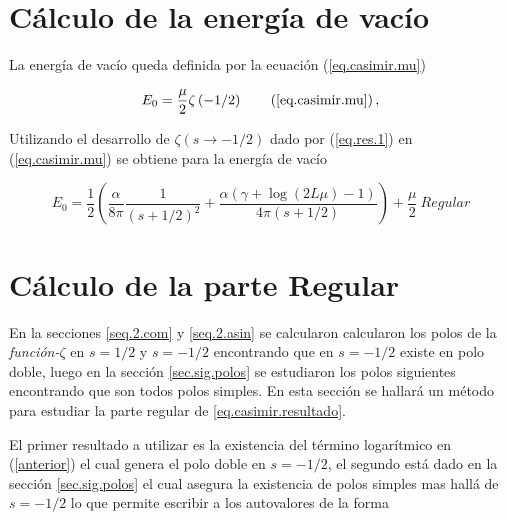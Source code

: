 \begin{comment}
\begin{equation}
\frac{1 }{2 \pi i}
\int _{circulo} \lambda ^{-2s } \partial \lambda \ Ln \left[
					\frac{e ^{\frac{i \alpha  \log ( 2 \lambda L )}{2 \lambda}} e ^{2 i \lambda L} S1}
					{\Gamma \left( 1 - \frac{i \alpha}{2 \lambda} \right)} - 
					\frac{e ^{\frac{-i \alpha  \log (2 \lambda L )}{2 \lambda}} S2}
					{\Gamma \left( 1 + \frac{i \alpha}{2 \lambda} \right)}					
					\right] d \lambda
\end{equation}
\end{comment}


\section{Cálculo de la energía de vacío}

La energía de vacío queda definida por la ecuación (\ref{eq.casimir.mu})

\begin{equation}
    E _0 = \frac{\mu }{2}  
    \zeta  \left( - 1/2 \right) 
    \tag{\ref{eq.casimir.mu}} \, ,
\end{equation}

Utilizando el desarrollo de $\zeta  (s \rightarrow -1/2)$ dado por (\ref{eq.res.1}) en (\ref{eq.casimir.mu}) se obtiene para la energía de vacío

\begin{equation}\label{eq.casimir.resultado}
E _0 = \frac{1}{2} \left(
				\frac{\alpha}{8 \pi  } \frac{1}{(s+1/2)^2} + 
				\frac{\alpha ( \gamma  +  \log (2L \mu ) -1 )}{4 \pi  (s+1/2)}
				\right) + 
				\frac{\mu}{2} \ Regular
\end{equation}

\section{Cálculo de la parte Regular}

En la secciones \ref{seq.2.com} y \ref{seq.2.asin} se calcularon calcularon los polos de la \mbox{{\it función-$\zeta$}} en $s=1/2$ y $s=-1/2$ encontrando que en $s=-1/2$ existe en polo doble, luego en la sección \ref{sec.sig.polos} se estudiaron los polos siguientes encontrando que son todos polos simples. En esta sección se hallará un método para estudiar la parte regular de \ref{eq.casimir.resultado}.


El primer resultado a utilizar es la existencia del término logarítmico en (\ref{anterior}) el cual genera el polo doble en $s=-1/2$, el segundo está dado en la sección \ref{sec.sig.polos} el cual asegura la existencia de polos simples mas hallá de $s=-1/2$ lo que permite escribir a los autovalores de la forma

